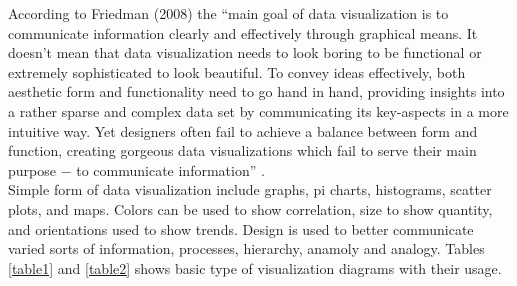 According to Friedman (2008) the ``main goal of data visualization is to communicate information clearly and effectively through graphical means. It doesn't mean that data visualization needs to look boring to be functional or extremely sophisticated to look beautiful. To convey ideas effectively, both aesthetic form and functionality need to go hand in hand, providing insights into a rather sparse and complex data set by communicating its key-aspects in a more intuitive way. Yet designers often fail to achieve a balance between form and function, creating gorgeous data visualizations which fail to serve their main purpose $-$ to communicate information'' \cite{Intro03}.\\

Simple form of data visualization include graphs, pi charts, histograms, scatter plots, and maps. Colors can be used to show correlation, size to show quantity, and orientations used to show trends. Design is used to better communicate varied sorts of information, processes, hierarchy, anamoly and analogy. Tables \ref{table1} and \ref{table2} shows basic type of visualization diagrams with their usage.



